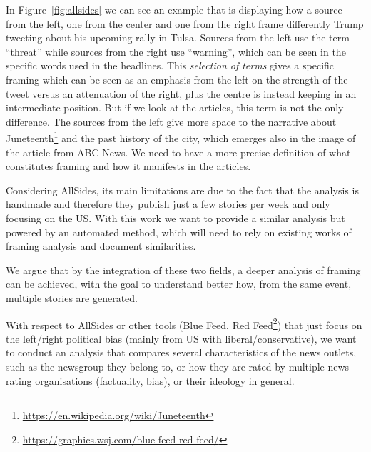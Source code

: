 In Figure~\ref{fig:allsides} we can see an example that is displaying how a source from the left, one from the center and one from the right frame differently Trump tweeting about his upcoming rally in Tulsa.
Sources from the left use the term ``threat'' while sources from the right use ``warning'', which can be seen in the specific words used in the headlines.
This \emph{selection of terms} gives a specific framing which can be seen as an emphasis from the left on the strength of the tweet versus an attenuation of the right, plus the centre is instead keeping in an intermediate position.
But if we look at the articles, this term is not the only difference. The sources from the left give more space to the narrative about Juneteenth\footnote{\url{https://en.wikipedia.org/wiki/Juneteenth}} and the past history of the city, which emerges also in the image of the article from ABC News.
We need to have a more precise definition of what constitutes framing and how it manifests in the articles.


Considering AllSides, its main limitations are due to the fact that the analysis is handmade and therefore they publish just a few stories per week and only focusing on the US.
With this work we want to provide a similar analysis but powered by an automated method, which will need to rely on existing works of framing analysis and document similarities.



We argue that by the integration of these two fields, a deeper analysis of framing can be achieved, with the goal to understand better how, from the same event, multiple stories are generated.


With respect to AllSides or other tools (Blue Feed, Red Feed\footnote{\url{https://graphics.wsj.com/blue-feed-red-feed/}}) that just focus on the left/right political bias (mainly from US with liberal/conservative), we want to conduct an analysis that compares several characteristics of the news outlets, such as the newsgroup they belong to, or how they are rated by multiple news rating organisations (factuality, bias), or their ideology in general.

